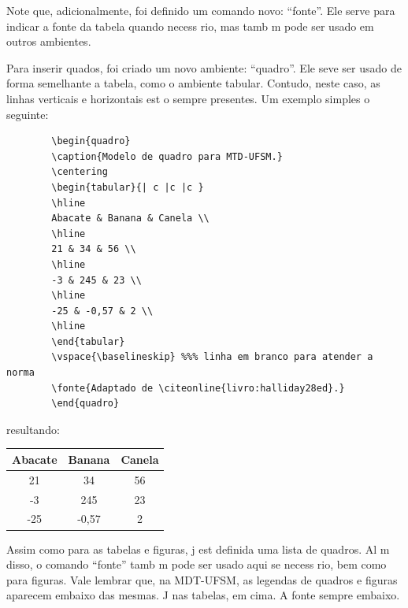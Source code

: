\documentclass{article}
\begin{document}
         \par Note que, adicionalmente, foi definido um comando novo: ``fonte''. Ele serve para indicar a fonte da tabela quando necess rio, mas tamb m pode ser usado em outros ambientes.
         
         \par Para inserir quados, foi criado um novo ambiente: ``quadro''. Ele seve ser usado de forma semelhante a tabela, como o ambiente tabular. Contudo, neste caso, as linhas verticais e horizontais est o sempre presentes. Um exemplo simples   o seguinte: 
         
         
         \begin{verbatim}
	    \begin{quadro}
   	    \caption{Modelo de quadro para MTD-UFSM.}
	    \centering
	    \begin{tabular}{| c |c |c }
	    \hline
	    Abacate & Banana & Canela \\
	    \hline
	    21 & 34 & 56 \\
	    \hline
	    -3 & 245 & 23 \\
	    \hline
	    -25 & -0,57 & 2 \\
	    \hline
	    \end{tabular}
	    \vspace{\baselineskip} %%% linha em branco para atender a norma
	    \fonte{Adaptado de \citeonline{livro:halliday28ed}.}
	    \end{quadro}
         \end{verbatim}
         
         \noindent resultando:
         
	    \begin{quadro}
	    \caption{Modelo de quadro para MTD-UFSM.}
	    \centering
	    \begin{tabular}{| c |c |c |}
	    \hline
	    Abacate & Banana & Canela \\
	    \hline
	    21 & 34 & 56 \\
	    \hline
	    -3 & 245 & 23 \\
	    \hline
	    -25 & -0,57 & 2 \\
	    \hline
	    \end{tabular}
	    \vspace{\baselineskip} %
	    \end{quadro}
	    

         \noindent Assim como para as tabelas e figuras, j  est  definida uma lista de quadros. Al m disso, o comando ``fonte'' tamb m pode ser usado aqui se necess rio, bem como para figuras. Vale lembrar que, na MDT-UFSM, as legendas de quadros e figuras aparecem embaixo das mesmas. J  nas tabelas, em cima. A fonte sempre embaixo.
         
\end{document}
